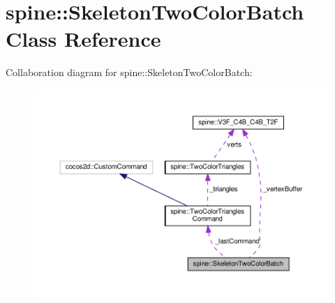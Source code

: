 \hypertarget{classspine_1_1SkeletonTwoColorBatch}{}\section{spine\+:\+:Skeleton\+Two\+Color\+Batch Class Reference}
\label{classspine_1_1SkeletonTwoColorBatch}


Collaboration diagram for spine\+:\+:Skeleton\+Two\+Color\+Batch\+:
\nopagebreak
\begin{figure}[H]
\begin{center}
\leavevmode
\includegraphics[width=350pt]{classspine_1_1SkeletonTwoColorBatch__coll__graph}
\end{center}
\end{figure}
